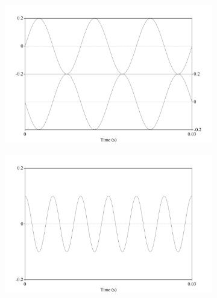\DIFaddbegin \begin{figure}[H]
\begin{subfigure}{0.5\textwidth}
  \includegraphics[width=\textwidth]{figure/wave-out-of-phase.png}
  \caption{}
  \label{fig:wave-out-of-phase2}
\end{subfigure}
\qquad
\begin{subfigure}{0.5\textwidth}
  \includegraphics[width=\textwidth]{figure/sound-wave-addition-200hz-shifted.png}
  \caption{}
  \label{fig:wave-addition-200hz-shifted}
\end{subfigure}
\begin{center}
\begin{subfigure}{0.5\textwidth}

\end{subfigure}
\end{center}
\end{figure}
